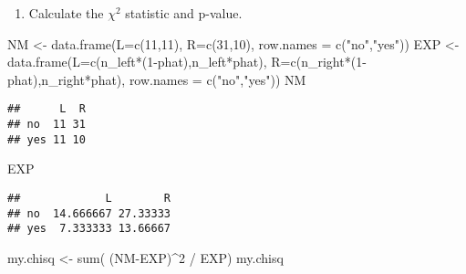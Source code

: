 \documentclass[
]{article}
\newenvironment{Shaded}{\begin{snugshade}}{\end{snugshade}}
\newcommand{\AttributeTok}[1]{\textcolor[rgb]{0.77,0.63,0.00}{#1}}
\newcommand{\DecValTok}[1]{\textcolor[rgb]{0.00,0.00,0.81}{#1}}
\newcommand{\FunctionTok}[1]{\textcolor[rgb]{0.00,0.00,0.00}{#1}}
\newcommand{\NormalTok}[1]{#1}
\newcommand{\OtherTok}[1]{\textcolor[rgb]{0.56,0.35,0.01}{#1}}
\newcommand{\SpecialCharTok}[1]{\textcolor[rgb]{0.00,0.00,0.00}{#1}}
\newcommand{\StringTok}[1]{\textcolor[rgb]{0.31,0.60,0.02}{#1}}
\providecommand{\tightlist}{%
  \setlength{\itemsep}{0pt}\setlength{\parskip}{0pt}}
\begin{document}
\begin{enumerate}
\def\labelenumi{(\arabic{enumi})}
\setcounter{enumi}{11}
\tightlist
\item
  Calculate the \(\chi^2\) statistic and p-value.
\end{enumerate}

\begin{Shaded}
\begin{Highlighting}[]
\NormalTok{NM }\OtherTok{\textless{}{-}} \FunctionTok{data.frame}\NormalTok{(}\AttributeTok{L=}\FunctionTok{c}\NormalTok{(}\DecValTok{11}\NormalTok{,}\DecValTok{11}\NormalTok{), }
                 \AttributeTok{R=}\FunctionTok{c}\NormalTok{(}\DecValTok{31}\NormalTok{,}\DecValTok{10}\NormalTok{), }
                 \AttributeTok{row.names =} \FunctionTok{c}\NormalTok{(}\StringTok{"no"}\NormalTok{,}\StringTok{"yes"}\NormalTok{))}
\NormalTok{EXP }\OtherTok{\textless{}{-}} \FunctionTok{data.frame}\NormalTok{(}\AttributeTok{L=}\FunctionTok{c}\NormalTok{(n\_left}\SpecialCharTok{*}\NormalTok{(}\DecValTok{1}\SpecialCharTok{{-}}\NormalTok{phat),n\_left}\SpecialCharTok{*}\NormalTok{phat), }
                  \AttributeTok{R=}\FunctionTok{c}\NormalTok{(n\_right}\SpecialCharTok{*}\NormalTok{(}\DecValTok{1}\SpecialCharTok{{-}}\NormalTok{phat),n\_right}\SpecialCharTok{*}\NormalTok{phat), }
                  \AttributeTok{row.names =} \FunctionTok{c}\NormalTok{(}\StringTok{"no"}\NormalTok{,}\StringTok{"yes"}\NormalTok{))}
\NormalTok{NM}
\end{Highlighting}
\end{Shaded}

\begin{verbatim}
##      L  R
## no  11 31
## yes 11 10
\end{verbatim}

\begin{Shaded}
\begin{Highlighting}[]
\NormalTok{EXP}
\end{Highlighting}
\end{Shaded}

\begin{verbatim}
##             L        R
## no  14.666667 27.33333
## yes  7.333333 13.66667
\end{verbatim}

\begin{Shaded}
\begin{Highlighting}[]
\NormalTok{my.chisq }\OtherTok{\textless{}{-}} \FunctionTok{sum}\NormalTok{( (NM}\SpecialCharTok{{-}}\NormalTok{EXP)}\SpecialCharTok{\^{}}\DecValTok{2} \SpecialCharTok{/}\NormalTok{ EXP)}
\NormalTok{my.chisq}
\end{Highlighting}
\end{Shaded}
\end{document}
